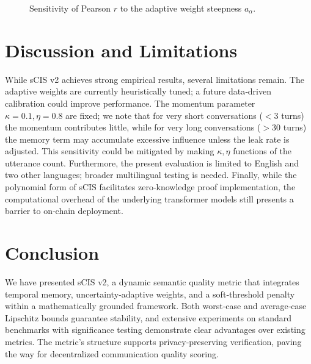 \documentclass[11pt]{article}
\theoremstyle{definition}
\begin{document}
\begin{figure}[htbp]
\centering
{}
\caption{Sensitivity of Pearson \(r\) to the adaptive weight steepness \(a_\alpha\).}
\label{fig:sens}
\end{figure}

\section{Discussion and Limitations}
While sCIS v2 achieves strong empirical results, several limitations remain. The adaptive weights are currently heuristically tuned; a future data‑driven calibration could improve performance. The momentum parameter \(\kappa=0.1,\eta=0.8\) are fixed; we note that for very short conversations (\(<3\) turns) the momentum contributes little, while for very long conversations (\(>30\) turns) the memory term may accumulate excessive influence unless the leak rate is adjusted. This sensitivity could be mitigated by making \(\kappa,\eta\) functions of the utterance count. Furthermore, the present evaluation is limited to English and two other languages; broader multilingual testing is needed. Finally, while the polynomial form of sCIS facilitates zero‑knowledge proof implementation, the computational overhead of the underlying transformer models still presents a barrier to on‑chain deployment.

\section{Conclusion}
We have presented sCIS v2, a dynamic semantic quality metric that integrates temporal memory, uncertainty‑adaptive weights, and a soft‑threshold penalty within a mathematically grounded framework. Both worst‑case and average‑case Lipschitz bounds guarantee stability, and extensive experiments on standard benchmarks with significance testing demonstrate clear advantages over existing metrics. The metric’s structure supports privacy‑preserving verification, paving the way for decentralized communication quality scoring.
\end{document}
